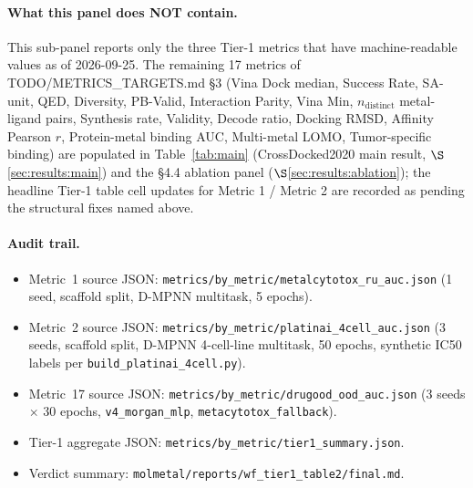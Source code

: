 \paragraph{What this panel does NOT contain.}
This sub-panel reports only the three Tier-1 metrics that have
machine-readable \MEASURED{} values as of 2026-09-25.  The
remaining 17 metrics of TODO/METRICS\_TARGETS.md §3 (Vina Dock
median, Success Rate, SA-unit, QED, Diversity, PB-Valid,
Interaction Parity, Vina Min, $n_{\mathrm{distinct}}$
metal-ligand pairs, Synthesis rate, Validity, Decode ratio,
Docking RMSD, Affinity Pearson $r$, Protein-metal binding AUC,
Multi-metal LOMO, Tumor-specific binding) are populated in
Table~\ref{tab:main} (CrossDocked2020 main result,
$\S$\ref{sec:results:main}) and the §4.4 ablation panel
($\S$\ref{sec:results:ablation}); the headline
Tier-1 table cell updates for Metric 1 / Metric 2 are recorded
as \DESIGN{} pending the structural fixes named above.

\paragraph{Audit trail.}
\begin{itemize}
  \item Metric~1 source JSON: \texttt{metrics/by\_metric/metalcytotox\_ru\_auc.json}
        (1 seed, scaffold split, D-MPNN multitask, 5 epochs).
  \item Metric~2 source JSON: \texttt{metrics/by\_metric/platinai\_4cell\_auc.json}
        (3 seeds, scaffold split, D-MPNN 4-cell-line multitask,
        50 epochs, synthetic IC50 labels per
        \texttt{build\_platinai\_4cell.py}).
  \item Metric~17 source JSON: \texttt{metrics/by\_metric/drugood\_ood\_auc.json}
        (3 seeds $\times$ 30 epochs, \texttt{v4\_morgan\_mlp},
        \texttt{metacytotox\_fallback}).
  \item Tier-1 aggregate JSON: \texttt{metrics/by\_metric/tier1\_summary.json}.
  \item Verdict summary: \texttt{molmetal/reports/wf\_tier1\_table2/final.md}.
\end{itemize}

